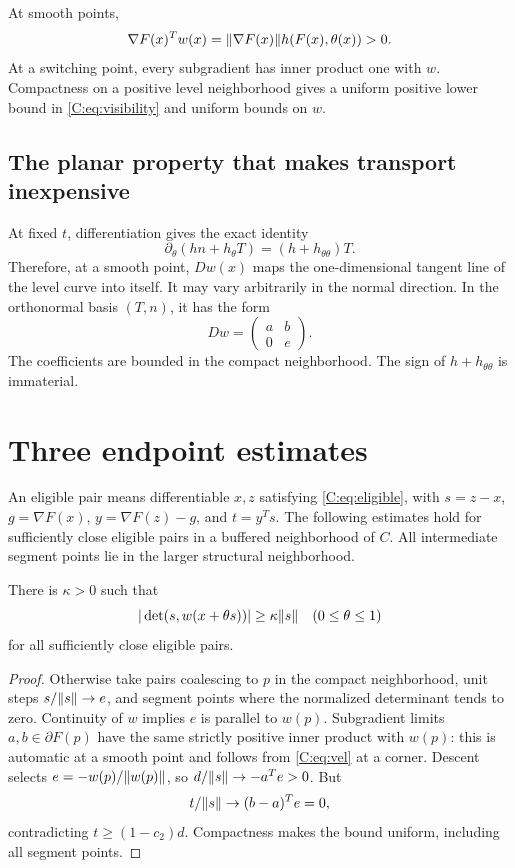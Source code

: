At smooth points,
\begin{equation}\label{C:eq:visibility}
 \nabla F(x)^Tw(x)=\lVert \nabla F(x)\rVert h(F(x),\theta(x))>0.
\end{equation}
At a switching point, every subgradient has inner product one with $w$. Compactness on a positive level neighborhood gives a uniform positive lower bound in \eqref{C:eq:visibility} and uniform bounds on $w$.

\subsection{The planar property that makes transport inexpensive}
At fixed $t$, differentiation gives the exact identity
\begin{equation}\label{C:eq:angleidentity}
 \partial_\theta(hn+h_\theta T)=(h+h_{\theta\theta})T.
\end{equation}
Therefore, at a smooth point, $Dw(x)$ maps the one-dimensional tangent line of the level curve into itself. It may vary arbitrarily in the normal direction. In the orthonormal basis $(T,n)$, it has the form
\begin{equation}\label{C:eq:triangular}
 Dw=\begin{pmatrix} a&b\\0&e\end{pmatrix}.
\end{equation}
The coefficients are bounded in the compact neighborhood. The sign of $h+h_{\theta\theta}$ is immaterial.


\setcounter{section}{4}
\setcounter{theorem}{4}
\setcounter{equation}{12}
\section{Three endpoint estimates}
An eligible pair means differentiable $x,z$ satisfying \eqref{C:eq:eligible}, with $s=z-x$, $g=\nabla F(x)$, $y=\nabla F(z)-g$, and $t=y^Ts$. The following estimates hold for sufficiently close eligible pairs in a buffered neighborhood of $C$. All intermediate segment points lie in the larger structural neighborhood.

\begin{lemma}\label{C:lem:trans}
There is $\kappa>0$ such that
\[
 |\det(s,w(x+\theta s))|\ge\kappa\lVert s\rVert
 \quad(0\le\theta\le1)
\]
for all sufficiently close eligible pairs.
\end{lemma}
\begin{proof}
Otherwise take pairs coalescing to $p$ in the compact neighborhood, unit steps $s/\lVert s\rVert\to e$, and segment points where the normalized determinant tends to zero. Continuity of $w$ implies $e$ is parallel to $w(p)$. Subgradient limits $a,b\in\partial F(p)$ have the same strictly positive inner product with $w(p)$: this is automatic at a smooth point and follows from \eqref{C:eq:vel} at a corner. Descent selects $e=-w(p)/\lVert w(p)\rVert$, so $d/\lVert s\rVert\to-a^Te>0$. But
\[
 t/\lVert s\rVert\to(b-a)^Te=0,
\]
contradicting $t\ge(1-c_2)d$. Compactness makes the bound uniform, including all segment points.
\end{proof}

